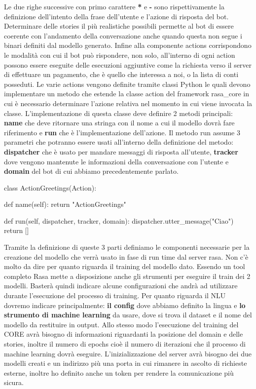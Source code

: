 Le due righe successive con primo carattere \textbf{*} e \textbf{-} sono rispettivamente la definizione dell'intento della frase dell'utente e l'azione di risposta del bot.
Determinare delle stories il più realistiche possibili permette al bot di essere coerente con l'andamento della conversazione anche quando questa non segue i binari definiti dal modello generato.
Infine alla componente actions corrispondono le modalità con cui il bot può rispondere, non solo, all'interno di ogni action possono essere eseguite delle esecuzioni aggiuntive come la richiesta verso il server di effettuare un pagamento, che è quello che interessa a noi, o la lista di conti posseduti.
Le varie actions vengono definite tramite classi Python le quali devono implementare un metodo che estende la classe action del framework rasa\_core in cui è necessario determinare l'azione relativa nel momento in cui viene invocata la classe.
L'implementazione di questa classe deve definire 2 metodi principali: \textbf{name} che deve ritornare una stringa con il nome a cui il modello dovrà fare riferimento e \textbf{run} che è l'implementazione dell'azione.
Il metodo run assume 3 parametri che potranno essere usati all'interno della definizione del metodo: \textbf{dispatcher} che è usato per mandare messaggi di risposta all'utente, \textbf{tracker} dove vengono mantenute le informazioni della conversazione con l'utente e \textbf{domain} del bot di cui abbiamo precedentemente parlato.
\begin{python}
class ActionGreetings(Action):

    def name(self):
        return "ActionGreetings"

    def run(self, dispatcher, tracker, domain):
        dispatcher.utter_message("Ciao")
        return []
\end{python}
Tramite la definizione di queste 3 parti definiamo le componenti necessarie per la creazione del modello che verrà usato in fase di run time dal server rasa.
Non c'è molto da dire per quanto riguarda il training del modello dato.
Essendo un tool completo Rasa mette a disposizione anche gli strumenti per eseguire il train dei 2 modelli. Basterà quindi indicare alcune configurazioni che andrà ad utilizzare durante l'esecuzione del processo di training.
Per quanto riguarda il NLU dovremo indicare principalmente: \textbf{il config} dove abbiamo definito la lingua e \textbf{lo strumento di machine learning} da usare, dove si trova il dataset e il nome del modello da restituire in output.
Allo stesso modo l'esecuzione del training del CORE avrà bisogno di informazioni riguardanti la posizione del domain e delle stories, inoltre il numero di epochs cioè il numero di iterazioni che il processo di machine learning dovrà eseguire.
L'inizializzazione del server avrà bisogno dei due modelli creati e un indirizzo più una porta in cui rimanere in ascolto di richieste esterne, inoltre ho definito anche un token per rendere la comunicazione più sicura.

